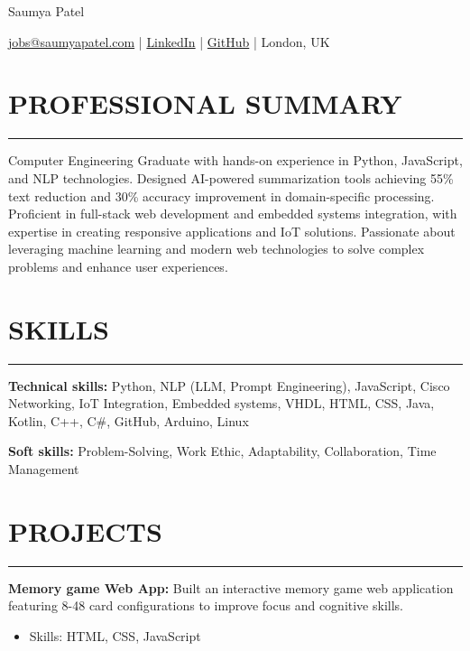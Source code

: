 \documentclass[11pt, letterpaper]{article} %
\newcommand{\resumesection}[1]{%
    \section*{#1}
    \vspace{-8pt}
    \noindent\rule{\textwidth}{0.6pt}
    \vspace{1pt}
    \noindent
}
\begin{document}
\begin{center}
{\fontsize{28}{32}\selectfont Saumya Patel}
\end{center}


\begin{center}
\href{mailto:jobs@saumyapatel.com}{jobs@saumyapatel.com} \quad | \quad \href{https://linkedin.com/in/contact-saumya-patel}{LinkedIn} \quad | \quad \href{https://github.com/Sam6219}{GitHub} \quad | \quad London, UK
\end{center}

\vspace{2pt}

\resumesection{PROFESSIONAL SUMMARY}Computer Engineering Graduate with hands-on experience in Python, JavaScript, and NLP technologies. Designed AI-powered summarization tools achieving 55\% text reduction and 30\% accuracy improvement in domain-specific processing. Proficient in full-stack web development and embedded systems integration, with expertise in creating responsive applications and IoT solutions. Passionate about leveraging machine learning and modern web technologies to solve complex problems and enhance user experiences.

\vspace{6pt}

\resumesection{SKILLS}\textbf{Technical skills:} Python, NLP (LLM, Prompt Engineering), JavaScript, Cisco Networking, IoT Integration, Embedded systems, VHDL, HTML, CSS, Java, Kotlin, C++, C\#, GitHub, Arduino, Linux

\vspace{6pt}

\noindent\textbf{Soft skills:} Problem-Solving, Work Ethic, Adaptability, Collaboration, Time Management

\vspace{6pt}

\resumesection{PROJECTS}\textbf{Memory game Web App:} Built an interactive memory game web application featuring 8-48 card configurations to improve focus and cognitive skills.
\begin{itemize}
    \item Skills: HTML, CSS, JavaScript
\end{itemize}

\vspace{6pt}
\end{document}
